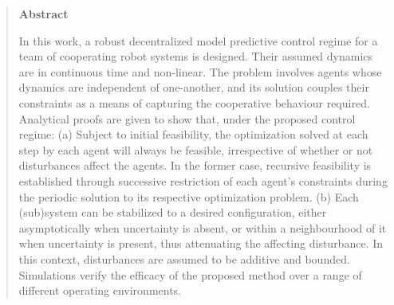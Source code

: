 

\begin{quotation}

\begin{center}
\textbf{Abstract}
\end{center}

In this work, a robust decentralized model predictive control regime for a team
of cooperating robot systems is designed. Their assumed dynamics are
in continuous time and non-linear. The problem involves agents whose dynamics
are independent of one-another, and its solution couples their constraints as a
means of capturing the cooperative behaviour required.
Analytical proofs are given to show that, under the proposed control regime:
(a) Subject to initial feasibility, the optimization solved at each step
by each agent will always be feasible, irrespective of whether or not
disturbances affect the agents. In the former case, recursive feasibility is
established through successive restriction of each agent's constraints during
the periodic solution to its respective optimization problem.
(b) Each (sub)system can be stabilized to a desired configuration, either
asymptotically when uncertainty is absent, or within a neighbourhood of it when
uncertainty is present, thus attenuating the affecting disturbance.
In this context, disturbances are assumed to be additive and bounded.
Simulations verify the efficacy of the proposed method over a range of different
operating environments.

\end{quotation}

\restoregeometry
